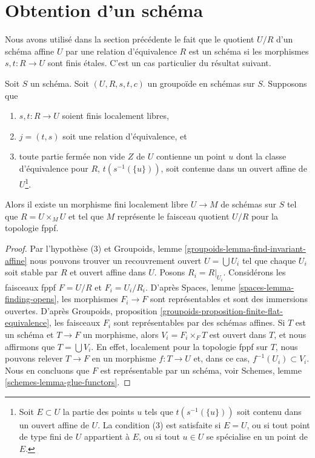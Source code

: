 \section{Obtention d'un schéma}
\label{section-getting-a-scheme}

\noindent
Nous avons utilisé dans la section précédente le fait que le quotient $U/R$ d'un
schéma affine $U$ par une relation d'équivalence $R$ est un schéma si les
morphismes $s, t : R \to U$ sont finis \'etales. C'est un cas particulier
du résultat suivant.

\begin{proposition}
\label{proposition-finite-flat-equivalence-global}
Soit $S$ un schéma.
Soit $(U, R, s, t, c)$ un groupoïde en schémas sur $S$.
Supposons que
\begin{enumerate}
\item $s, t : R \to U$ soient finis localement libres,
\item $j = (t, s)$ soit une relation d'équivalence, et
\item toute partie fermée non vide $Z$ de $U$ contienne un point
$u$ dont la classe d'équivalence pour $R$, $t(s^{-1}(\{u\}))$, soit contenue
dans un ouvert affine de $U$\footnote{Soit $E \subset U$ la
partie des points $u$ tels que $t(s^{-1}(\{u\}))$
soit contenu dans un ouvert affine de $U$. La condition (3) est satisfaite
si $E = U$, ou si tout point de type fini de $U$ appartient à $E$, ou
si tout $u \in U$ se spécialise en un point de $E$.}.
\end{enumerate}
Alors il existe un morphisme fini localement libre $U \to M$
de schémas sur $S$ tel que $R = U \times_M U$ et tel que $M$
représente le faisceau quotient $U/R$ pour la topologie fppf.
\end{proposition}

\begin{proof}
Par l'hypothèse (3) et
Groupoids, lemme \ref{groupoids-lemma-find-invariant-affine}
nous pouvons trouver un recouvrement ouvert $U = \bigcup U_i$ tel que chaque $U_i$
soit stable par $R$ et ouvert affine dans $U$. Posons $R_i = R|_{U_i}$.
Considérons les faisceaux fppf $F = U/R$ et $F_i = U_i/R_i$.
D'après Spaces, lemme \ref{spaces-lemma-finding-opens}, les morphismes
$F_i \to F$ sont représentables et sont des immersions ouvertes.
D'après Groupoids, proposition \ref{groupoids-proposition-finite-flat-equivalence},
les faisceaux $F_i$ sont représentables par des schémas affines.
Si $T$ est un schéma et $T \to F$ un morphisme, alors $V_i = F_i \times_F T$
est ouvert dans $T$, et nous affirmons que $T = \bigcup V_i$. En effet,
localement pour la topologie fppf sur $T$, nous pouvons relever $T \to F$ en un morphisme
$f : T \to U$ et, dans ce cas, $f^{-1}(U_i) \subset V_i$.
Nous en concluons que $F$ est représentable par un schéma, voir
Schemes, lemme \ref{schemes-lemma-glue-functors}.
\end{proof}

